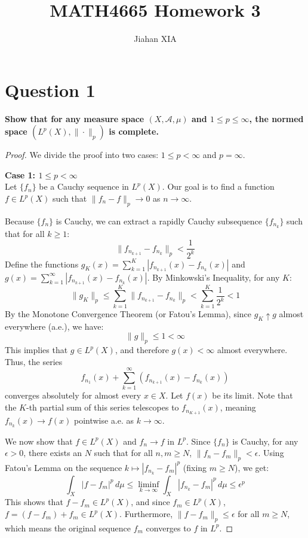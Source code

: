 \documentclass[11pt,en]{elegantpaper}
\title{MATH4665 Homework 3}
\author{Jiahan XIA}
\begin{document}
\maketitle 

\section*{Question 1}
\textbf{Show that for any measure space $(X, \mathcal{A}, \mu)$ and $1 \le p \le \infty$, the normed space $(L^p(X), \|\cdot\|_p)$ is complete.}

\begin{proof}
We divide the proof into two cases: $1 \le p < \infty$ and $p = \infty$.

\textbf{Case 1: $1 \le p < \infty$} \\
Let $\{f_n\}$ be a Cauchy sequence in $L^p(X)$. Our goal is to find a function $f \in L^p(X)$ such that $\|f_n - f\|_p \to 0$ as $n \to \infty$. 

Because $\{f_n\}$ is Cauchy, we can extract a rapidly Cauchy subsequence $\{f_{n_k}\}$ such that for all $k \ge 1$:
$$\|f_{n_{k+1}} - f_{n_k}\|_p < \frac{1}{2^k}$$
Define the functions $g_K(x) = \sum_{k=1}^K |f_{n_{k+1}}(x) - f_{n_k}(x)|$ and $g(x) = \sum_{k=1}^\infty |f_{n_{k+1}}(x) - f_{n_k}(x)|$. 
By Minkowski's Inequality, for any $K$:
$$\|g_K\|_p \le \sum_{k=1}^K \|f_{n_{k+1}} - f_{n_k}\|_p < \sum_{k=1}^K \frac{1}{2^k} < 1$$
By the Monotone Convergence Theorem (or Fatou's Lemma), since $g_K \uparrow g$ almost everywhere (a.e.), we have:
$$\|g\|_p \le 1 < \infty$$
This implies that $g \in L^p(X)$, and therefore $g(x) < \infty$ almost everywhere. Thus, the series 
$$f_{n_1}(x) + \sum_{k=1}^\infty (f_{n_{k+1}}(x) - f_{n_k}(x))$$
converges absolutely for almost every $x \in X$. Let $f(x)$ be its limit. Note that the $K$-th partial sum of this series telescopes to $f_{n_{K+1}}(x)$, meaning $f_{n_k}(x) \to f(x)$ pointwise a.e. as $k \to \infty$.

We now show that $f \in L^p(X)$ and $f_n \to f$ in $L^p$. Since $\{f_n\}$ is Cauchy, for any $\epsilon > 0$, there exists an $N$ such that for all $n, m \ge N$, $\|f_n - f_m\|_p < \epsilon$. 
Using Fatou's Lemma on the sequence $k \mapsto |f_{n_k} - f_m|^p$ (fixing $m \ge N$), we get:
$$\int_X |f - f_m|^p \, d\mu \le \liminf_{k \to \infty} \int_X |f_{n_k} - f_m|^p \, d\mu \le \epsilon^p$$
This shows that $f - f_m \in L^p(X)$, and since $f_m \in L^p(X)$, $f = (f - f_m) + f_m \in L^p(X)$. Furthermore, $\|f - f_m\|_p \le \epsilon$ for all $m \ge N$, which means the original sequence $f_m$ converges to $f$ in $L^p$.


\end{proof}
\end{document}
